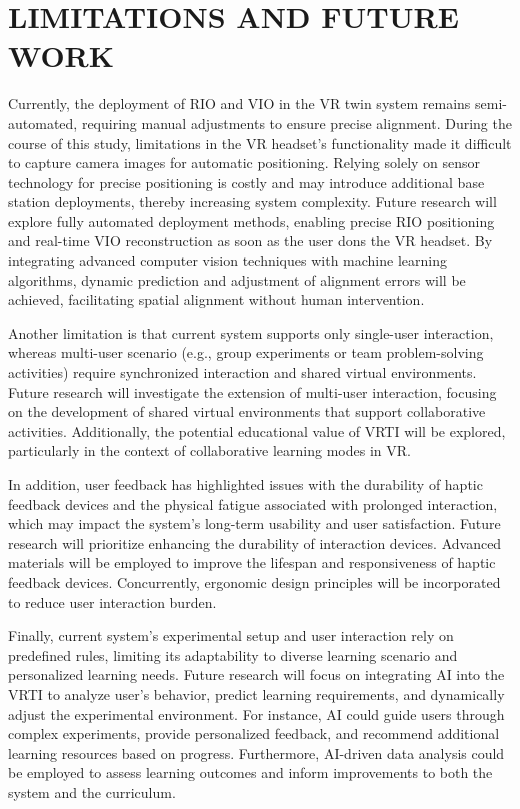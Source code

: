 \documentclass[sigconf,review,anonymous]{acmart}
\begin{document}
\section{LIMITATIONS AND FUTURE WORK}
Currently, the deployment of RIO and VIO in the VR twin system remains semi-automated, requiring manual adjustments to ensure precise alignment. During the course of this study, limitations in the VR headset's functionality made it difficult to capture camera images for automatic positioning. Relying solely on sensor technology for precise positioning is costly and may introduce additional base station deployments, thereby increasing system complexity. Future research will explore fully automated deployment methods, enabling precise RIO positioning and real-time VIO reconstruction as soon as the user dons the VR headset. By integrating advanced computer vision techniques with machine learning algorithms, dynamic prediction and adjustment of alignment errors will be achieved, facilitating spatial alignment without human intervention.

Another limitation is that current system supports only single-user interaction, whereas multi-user scenario (e.g., group experiments or team problem-solving activities) require synchronized interaction and shared virtual environments. Future research will investigate the extension of multi-user interaction, focusing on the development of shared virtual environments that support collaborative activities. Additionally, the potential educational value of VRTI will be explored, particularly in the context of collaborative learning modes in VR.

In addition, user feedback has highlighted issues with the durability of haptic feedback devices and the physical fatigue associated with prolonged interaction, which may impact the system's long-term usability and user satisfaction. Future research will prioritize enhancing the durability of interaction devices. Advanced materials will be employed to improve the lifespan and responsiveness of haptic feedback devices. Concurrently, ergonomic design principles will be incorporated to reduce user interaction burden.

Finally, current system's experimental setup and user interaction rely on predefined rules, limiting its adaptability to diverse learning scenario and personalized learning needs. Future research will focus on integrating AI into the VRTI to analyze user's behavior, predict learning requirements, and dynamically adjust the experimental environment. For instance, AI could guide users through complex experiments, provide personalized feedback, and recommend additional learning resources based on progress. Furthermore, AI-driven data analysis could be employed to assess learning outcomes and inform improvements to both the system and the curriculum.
\end{document}
